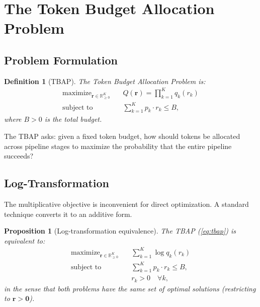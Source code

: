 \documentclass[11pt, a4paper, logo, copyright]{googledeepmind}
\DeclareMathOperator*{\maximize}{maximize}
\newtheorem{definition}{Definition}[section]
\newtheorem{proposition}{Proposition}[section]
\begin{document}
\section{The Token Budget Allocation Problem}\label{sec:tbap}

\subsection{Problem Formulation}

\begin{definition}[TBAP]\label{def:tbap}
The \emph{Token Budget Allocation Problem} is:
\begin{equation}\label{eq:tbap}
\begin{aligned}
    \maximize_{\mathbf{r} \in \mathbb{R}_{\geq 0}^K} \quad & Q(\mathbf{r}) = \prod_{k=1}^{K} q_k(r_k) \\
    \text{subject to} \quad & \sum_{k=1}^{K} p_k \cdot r_k \leq B,
\end{aligned}
\end{equation}
where $B > 0$ is the total budget.
\end{definition}

The TBAP asks: given a fixed token budget, how should tokens be allocated across pipeline stages to maximize the probability that the entire pipeline succeeds?

\subsection{Log-Transformation}

The multiplicative objective is inconvenient for direct optimization. A standard technique converts it to an additive form.

\begin{proposition}[Log-transformation equivalence]\label{prop:log-transform}
The TBAP (\cref{eq:tbap}) is equivalent to:
\begin{equation}\label{eq:tbap-log}
\begin{aligned}
    \maximize_{\mathbf{r} \in \mathbb{R}_{\geq 0}^K} \quad & \sum_{k=1}^{K} \log q_k(r_k) \\
    \text{subject to} \quad & \sum_{k=1}^{K} p_k \cdot r_k \leq B, \\
    & r_k > 0 \quad \forall k,
\end{aligned}
\end{equation}
in the sense that both problems have the same set of optimal solutions (restricting to $\mathbf{r} > \mathbf{0}$).
\end{proposition}
\end{document}
